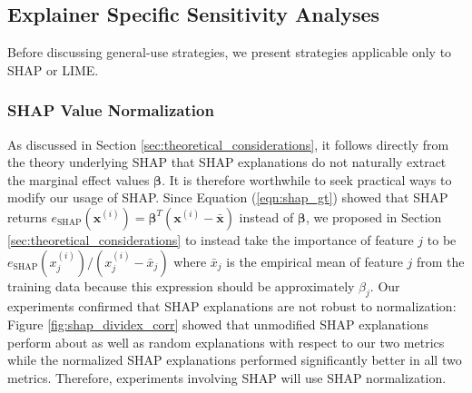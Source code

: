 \documentclass[mnsc,blindrev]{informs3}
\begin{document}
        
     


    
    
    \subsection{Explainer Specific Sensitivity Analyses}
        Before discussing general-use strategies, we present strategies applicable only to SHAP or LIME.%

            \subsubsection{SHAP Value Normalization}
                As discussed in Section \ref{sec:theoretical_considerations}, it follows directly from the theory underlying SHAP that SHAP explanations do not naturally extract the marginal effect values $\boldsymbol{\beta}$. It is therefore worthwhile to seek practical ways to modify our usage of SHAP. Since Equation (\ref{eqn:shap_gt}) showed that SHAP returns $e_{\text{SHAP}}(\mathbf{x}^{(i)})=\boldsymbol{\beta}^T(\mathbf{x}^{(i)} - \bar{\mathbf{x}})$ instead of $\boldsymbol{\beta}$, we proposed in Section \ref{sec:theoretical_considerations} to instead take the importance of feature $j$ to be $e_{\text{SHAP}}(x^{(i)}_j) / (x^{(i)}_j - \bar{x}_j)$ where $\bar{x}_j$ is the empirical mean of feature $j$ from the training data because this expression should be approximately $\beta_j$. Our experiments confirmed that SHAP explanations are not robust to normalization: Figure \ref{fig:shap_dividex_corr} showed that unmodified SHAP explanations perform about as well as random explanations with respect to our two metrics while the normalized SHAP explanations performed significantly better in all two metrics. Therefore, experiments involving SHAP will use SHAP normalization.%

\end{document}
